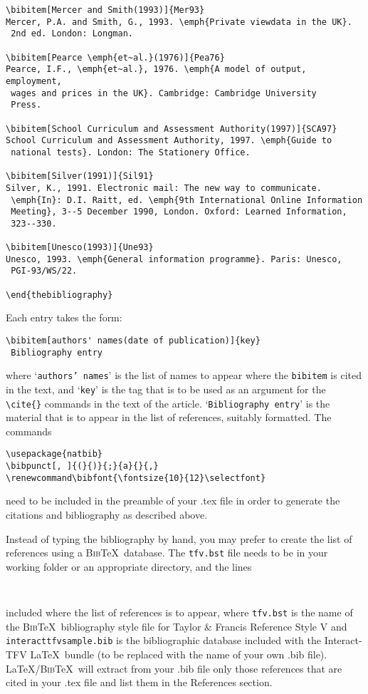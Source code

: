 \documentclass[]{interact}
\renewcommand\bibfont{\fontsize{10}{12}\selectfont}%
\theoremstyle{plain}%
\theoremstyle{definition}
\theoremstyle{remark}
\begin{document}
\begin{verbatim}
\bibitem[Mercer and Smith(1993)]{Mer93}
Mercer, P.A. and Smith, G., 1993. \emph{Private viewdata in the UK}.
 2nd ed. London: Longman.

\bibitem[Pearce \emph{et~al.}(1976)]{Pea76}
Pearce, I.F., \emph{et~al.}, 1976. \emph{A model of output, employment,
 wages and prices in the UK}. Cambridge: Cambridge University
 Press.

\bibitem[School Curriculum and Assessment Authority(1997)]{SCA97}
School Curriculum and Assessment Authority, 1997. \emph{Guide to
 national tests}. London: The Stationery Office.

\bibitem[Silver(1991)]{Sil91}
Silver, K., 1991. Electronic mail: The new way to communicate.
 \emph{In}: D.I. Raitt, ed. \emph{9th International Online Information
 Meeting}, 3--5 December 1990, London. Oxford: Learned Information,
 323--330.

\bibitem[Unesco(1993)]{Une93}
Unesco, 1993. \emph{General information programme}. Paris: Unesco,
 PGI-93/WS/22.

\end{thebibliography}
\end{verbatim}
\bigskip
\noindent Each entry takes the form:
\begin{verbatim}
\bibitem[authors' names(date of publication)]{key}
 Bibliography entry
\end{verbatim}
where `\texttt{authors' names}' is the list of names to appear where the \verb"bibitem" is cited in the text, and `\texttt{key}' is the tag that is to be used as an argument for the \verb"\cite{}" commands in the text of the article. `\texttt{Bibliography entry}' is the material that is to appear in the list of references, suitably formatted. The commands
\begin{verbatim}
\usepackage{natbib}
\bibpunct[, ]{(}{)}{;}{a}{}{,}
\renewcommand\bibfont{\fontsize{10}{12}\selectfont}
\end{verbatim}
need to be included in the preamble of your .tex file in order to generate the citations and bibliography as described above.

Instead of typing the bibliography by hand, you may prefer to create the list of references using a \textsc{Bib}\TeX\ database. The \texttt{tfv.bst} file needs to be in your working folder or an appropriate directory, and the lines
\begin{verbatim}


\end{verbatim}
included where the list of references is to appear, where \texttt{tfv.bst} is the name of the \textsc{Bib}\TeX\ bibliography style file for Taylor \& Francis Reference Style V and \texttt{interacttfvsample.bib} is the bibliographic database included with the \textsf{Interact}-TFV \LaTeX\ bundle (to be replaced with the name of your own .bib file). \LaTeX/\textsc{Bib}\TeX\ will extract from your .bib file only those references that are cited in your .tex file and list them in the References section.
\end{document}
